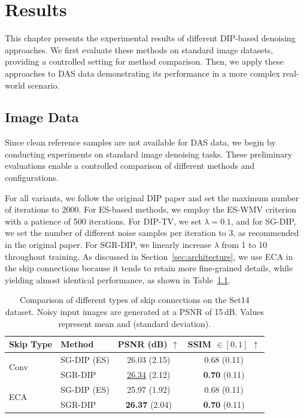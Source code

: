 \chapter{Results}\label{ch:results}

This chapter presents the experimental results of different DIP-based denoising approaches.
We first evaluate these methods on standard image datasets, providing a controlled setting for method comparison.
Then, we apply these approaches to DAS data demonstrating its performance in a more complex real-world scenario.

\section{Image Data}

Since clean reference samples are not available for DAS data, we begin by conducting experiments on standard image denoising tasks.
These preliminary evaluations enable a controlled comparison of different methods and configurations.

For all variants, we follow the original DIP paper and set the maximum number of iterations to 2000.
For ES-based methods, we employ the ES-WMV criterion with a patience of 500 iterations.
For DIP-TV, we set $\lambda = 0.1$, and for SG-DIP, we set the number of different noise samples per iteration to 3, as recommended in the original paper.
For SGR-DIP, we linearly increase $\lambda$ from 1 to 10 throughout training. 
As discussed in Section~\ref{sec:architecture}, we use ECA in the skip connections because it tends to retain more fine-grained details, while yielding almost identical performance, as shown in Table~\ref{tab:ECA}. 

\begin{table}
    \small
    \centering
    \begin{tabular}{ l l c c }
        \toprule
        Skip Type &Method &PSNR (dB) $\uparrow$ &SSIM $\in [0,1]$ $\uparrow$ \\
        \midrule
        \multirow{2}{4em}{Conv} &SG-DIP (ES) &26.03 {\scriptsize (2.15)} &0.68 {\scriptsize (0.11)} \\
        &SGR-DIP &\underline{26.34} {\scriptsize (2.12)} &\textbf{0.70} {\scriptsize (0.11)} \\
        \midrule
        \multirow{2}{4em}{ECA} &SG-DIP (ES) &25.97 {\scriptsize (1.92)} &0.68 {\scriptsize (0.11)} \\
        &SGR-DIP &\textbf{26.37} {\scriptsize (2.04)} &\textbf{0.70} {\scriptsize (0.11)} \\
        \bottomrule
    \end{tabular}
    \caption{
        Comparison of different types of skip connections on the Set14 dataset.
        Noisy input images are generated at a PSNR of 15\,dB.
        Values represent mean and {\scriptsize (standard deviation)}.
    }\label{tab:ECA}
\end{table}

